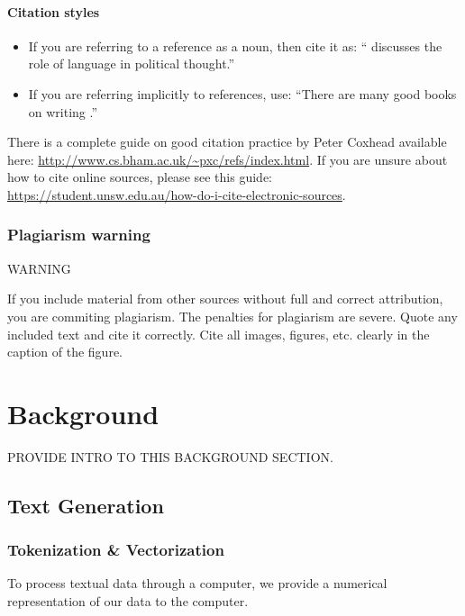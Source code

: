 \documentclass{l4proj}
\theoremstyle{definition}
\begin{document}
\subsubsection{Citation styles}

\begin{itemize}
\item If you are referring to a reference as a noun, then cite it as: ``\citet{Orw68} discusses the role of language in political thought.''
\item If you are referring implicitly to references, use: ``There are many good books on writing \citep{Orw68, Wil09, Pin15}.''
\end{itemize}

There is a complete guide on good citation practice by Peter Coxhead available here: \url{http://www.cs.bham.ac.uk/~pxc/refs/index.html}. 
If you are unsure about how to cite online sources, please see this guide: \url{https://student.unsw.edu.au/how-do-i-cite-electronic-sources}.

\subsection{Plagiarism warning}

\begin{highlight_title}{WARNING}
    
    If you include material from other sources without full and correct attribution, you are commiting plagiarism. The penalties for plagiarism are severe.
    Quote any included text and cite it correctly. Cite all images, figures, etc. clearly in the caption of the figure.
\end{highlight_title}


\chapter{Background}
PROVIDE INTRO TO THIS BACKGROUND SECTION. 

\section{Text Generation}
    \subsection{Tokenization \& Vectorization}
        To process textual data through a computer, we provide a numerical representation of our data to the computer.
        
\end{document}
